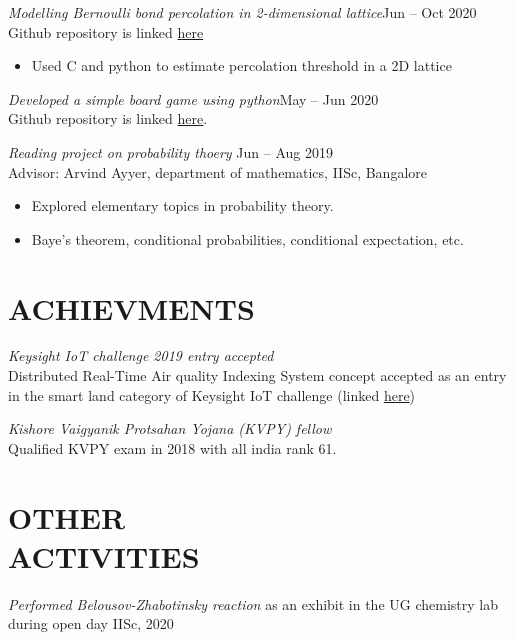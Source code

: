\documentclass[margin, 10pt]{res} %
\begin{document}
\begin{resume}
{\sl Modelling Bernoulli bond percolation in 2-dimensional lattice}\hfill Jun -- Oct 2020\\
Github repository is linked
\href{https://github.com/AbhinavM2000/percolation\_}{here}
\begin{itemize}
	\item Used C and python to estimate percolation threshold in a 2D lattice
\end{itemize}

\smallskip

{\sl Developed a simple board game using python}\hfill May -- Jun 2020\\
Github repository is linked
\href{https://github.com/DhanusML/marble-and-hole-puzzle}{here}.

\smallskip

{\sl Reading project on probability thoery} \hfill Jun -- Aug 2019 \\
Advisor: Arvind Ayyer, department of mathematics, IISc, Bangalore
\begin{itemize} \itemsep -2pt %
	\item Explored elementary topics in probability theory.
	\item Baye's theorem, conditional probabilities,
		conditional expectation, etc.
\end{itemize}




\section{ACHIEVMENTS}

{\sl Keysight IoT challenge 2019 entry accepted}\\
Distributed Real-Time Air quality Indexing System concept accepted
as an entry in the smart land category of Keysight IoT challenge
(linked \href{https://www.iotchallengekeysight.com/2019/entries/smart-land/41-0413-102730-draqis-distributed-real-time-air-quality-indexing-system}{here})

{\sl Kishore Vaigyanik Protsahan Yojana (KVPY) fellow}\\
Qualified KVPY exam in 2018 with all india rank 61.




\section{OTHER \\ ACTIVITIES} 
{\it Performed Belousov-Zhabotinsky reaction} as an exhibit
in the UG chemistry lab during open day IISc, 2020


\end{resume}
\end{document}
